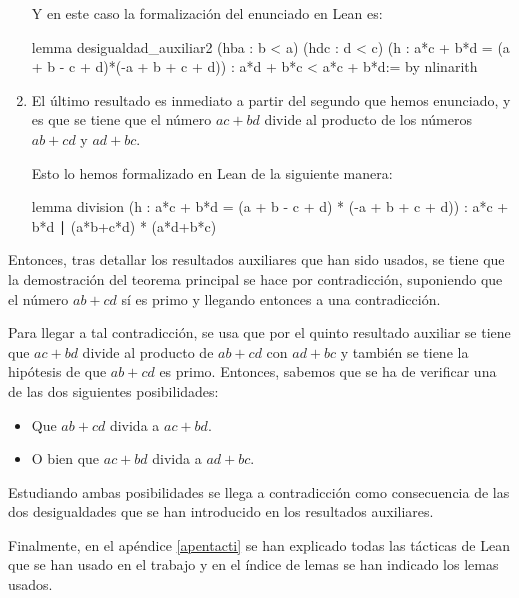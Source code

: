\begin{enumerate}
  Y en este caso la formalización del enunciado en Lean es:
  \begin{leancode}
  lemma desigualdad_auxiliar2
    (hba : b < a)
    (hdc : d < c)
    (h : a*c + b*d = (a + b - c + d)*(-a + b + c + d))
    : a*d + b*c < a*c + b*d:=
    by nlinarith
  \end{leancode}

\item El último resultado es inmediato a partir del segundo que hemos
  enunciado, y es que se tiene que el número \(ac+bd\) divide al
  producto de los números \(ab+cd\) y \(ad+bc\).

  Esto lo hemos formalizado en Lean de la siguiente manera:

  \begin{leancode}
  lemma division
    (h : a*c + b*d = (a + b - c + d) * (-a + b + c + d))
    : a*c + b*d ∣ (a*b+c*d) * (a*d+b*c)
  \end{leancode}

\end{enumerate}

Entonces, tras detallar los resultados auxiliares que han sido usados,
se tiene que la demostración del teorema principal se hace por
contradicción, suponiendo que el número \(ab+cd\) sí es primo y llegando
entonces a una contradicción.

Para llegar a tal contradicción, se usa que por el quinto resultado
auxiliar se tiene que \(ac+bd\) divide al producto de \(ab+cd\) con
\(ad+bc\) y también se tiene la hipótesis de que \(ab+cd\) es
primo. Entonces, sabemos que se ha de verificar una de las dos
siguientes posibilidades:
\begin{itemize}
\item Que \(ab+cd\) divida a \(ac+bd\).

\item O bien que \(ac+bd\) divida a \(ad+bc\).
\end{itemize}

Estudiando ambas posibilidades se llega a contradicción como
consecuencia de las dos desigualdades que se han introducido en los
resultados auxiliares.

Finalmente, en el apéndice \ref{apentacti} se han explicado todas
las tácticas de Lean que se han usado en el trabajo y en el índice de
lemas se han indicado los lemas usados.



